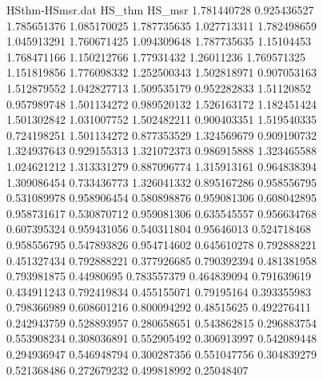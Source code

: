 \begin{figure}[htbp]
    \centering
        \begin{filecontents}{HSthm-HSmsr.dat}
                HS_thm	HS_msr
                1.781440728	0.925436527
                1.785651376	1.085170025
                1.787735635	1.027713311
                1.782498659	1.045913291
                1.760671425	1.094309648
                1.787735635	1.15104453
                1.768471166	1.150212766
                1.77931432	1.26011236
                1.769571325	1.151819856
                1.776098332	1.252500343
                1.502818971	0.907053163
                1.512879552	1.042827713
                1.509535179	0.952282833
                1.51120852	0.957989748
                1.501134272	0.989520132
                1.526163172	1.182451424
                1.501302842	1.031007752
                1.502482211	0.900403351
                1.519540335	0.724198251
                1.501134272	0.877353529
                1.324569679	0.909190732
                1.324937643	0.929155313
                1.321072373	0.986915888
                1.323465588	1.024621212
                1.313331279	0.887096774
                1.315913161	0.964838394
                1.309086454	0.733436773
                1.326041332	0.895167286
                0.958556795	0.531089978
                0.958906454	0.580898876
                0.959081306	0.608042895
                0.958731617	0.530870712
                0.959081306	0.635545557
                0.956634768	0.607395324
                0.959431056	0.540311804
                0.95646013	0.524718468
                0.958556795	0.547893826
                0.954714602	0.645610278
                0.792888221	0.451327434
                0.792888221	0.377926685
                0.790392394	0.481381958
                0.793981875	0.44980695
                0.783557379	0.464839094
                0.791639619	0.434911243
                0.792419834	0.455155071
                0.79195164	0.393355983
                0.798366989	0.608601216
                0.800094292	0.48515625
                0.492276411	0.242943759
                0.528893957	0.280658651
                0.543862815	0.296883754
                0.553908234	0.308036891
                0.552905492	0.306913997
                0.542089448	0.294936947
                0.546948794	0.300287356
                0.551047756	0.304839279
                0.521368486	0.272679232
                0.499818992	0.25048407                  
            \end{filecontents}
        

\end{figure}
